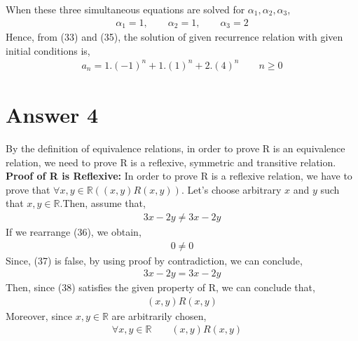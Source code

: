 \documentclass[12pt]{article}
\newcommand{\R}{\mathbb{R}}
\begin{document}
When these three simultaneous equations are solved for $\alpha_{1},\alpha_{2},\alpha_{3}$,
\begin{equation}
\begin{split}
\alpha_{1} =1,\qquad \alpha_{2} =1, \qquad \alpha_{3} = 2
\end{split}
\end{equation}
Hence, from (33) and (35), the solution of given recurrence relation with given initial conditions is,
\begin{equation*}
\begin{split}
a_{n} = 1.(-1)^n + 1.(1)^n + 2.(4)^n \qquad n \geq 0
\end{split}
\end{equation*}


\section*{Answer 4}
By the definition of equivalence relations, in order to prove R is an equivalence relation, we need to prove R is a reflexive, symmetric and transitive relation.\\
\textbf{Proof of R is Reflexive:}
In order to prove R is a reflexive relation, we have to prove that $\forall x,y\in \R((x,y)R(x,y))$. Let's choose arbitrary $x$ and $y$ such that $x,y \in \R$.Then, assume that,
\begin{equation}
\begin{split}
3x-2y \neq 3x-2y
\end{split}
\end{equation}
 If we rearrange (36), we obtain,
 \begin{equation}
 \begin{split}
 0 \neq 0
 \end{split}
 \end{equation}
 Since, (37) is false, by using proof by contradiction, we can conclude,
 \begin{equation}
 \begin{split}
 3x-2y = 3x-2y
 \end{split}
 \end{equation}
 Then, since (38) satisfies the given property of R, we can conclude that,
 \begin{equation}
 \begin{split}
 (x,y)R(x,y)
 \end{split}
 \end{equation}
 Moreover, since $x,y \in \R$ are arbitrarily chosen, 
\begin{equation}
\begin{split}
\forall x,y\in \R  \qquad (x,y)R(x,y) \quad 
\end{split}
\end{equation}
\end{document}
